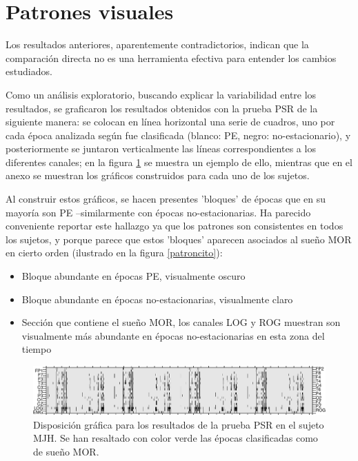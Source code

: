 \section{Patrones visuales}

Los resultados anteriores, aparentemente contradictorios, indican que la comparación directa no es 
una herramienta efectiva para entender los cambios estudiados.


Como un análisis exploratorio, buscando explicar la variabilidad entre los resultados, se 
graficaron los resultados obtenidos con la prueba PSR de la siguiente manera: se colocan en 
línea horizontal una serie de cuadros, uno por cada época analizada según fue clasificada 
(blanco: PE, negro: no-estacionario), y posteriormente se juntaron verticalmente las líneas
correspondientes a los diferentes canales; en la figura \ref{ejemplo_graf} se muestra un ejemplo de
ello, mientras que en el anexo se muestran los gráficos construidos para cada uno de los sujetos. 

Al construir estos gráficos, se hacen presentes 'bloques' de épocas que en su mayoría son
PE --similarmente con épocas no-estacionarias. Ha parecido conveniente reportar este hallazgo
ya que los patrones son consistentes en todos los sujetos, y porque parece que estos 'bloques'
aparecen asociados al sueño MOR en cierto orden (ilustrado en la figura \ref{patroncito}):
\begin{itemize}
\item Bloque abundante en épocas PE, visualmente oscuro
\item Bloque abundante en épocas no-estacionarias, visualmente claro
\item Sección que contiene el sueño MOR, los canales LOG y ROG muestran son visualmente más
abundante en épocas no-estacionarias en esta zona del tiempo
\end{itemize}

\begin{figure}
\includegraphics[width=\textwidth]
{./img_ejemplos/MJNNVIGILOS_est.png}
\caption{Disposición gráfica para los resultados de la prueba PSR en el sujeto MJH. Se han 
resaltado con color verde las épocas clasificadas como de sueño MOR.}
\label{ejemplo_graf}
\end{figure}


